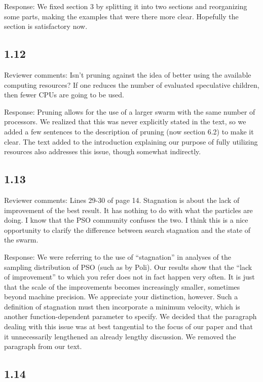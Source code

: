\documentclass[onecolumn, 12pt]{article}
\begin{document}
Response: We fixed section 3 by splitting it into two sections and reorganizing
some parts, making the examples that were there more clear.  Hopefully the
section is satisfactory now.

\subsection*{1.12}

Reviewer comments: Isn't pruning against the idea of better using the available
computing resources? If one reduces the number of evaluated speculative
children, then fewer CPUs are going to be used.

Response: Pruning allows for the use of a larger swarm with the same number of
processors.  We realized that this was never explicitly stated in the text, so
we added a few sentences to the description of pruning (now section 6.2) to
make it clear.  The text added to the introduction explaining our purpose of
fully utilizing resources also addresses this issue, though somewhat
indirectly.

\subsection*{1.13}

Reviewer comments: Lines 29-30 of page 14. Stagnation is about the lack of
improvement of the best result. It has nothing to do with what the particles
are doing. I know that the PSO community confuses the two. I think this is a
nice opportunity to clarify the difference between search stagnation and the
state of the swarm.

Response: We were referring to the use of ``stagnation'' in analyses of the
sampling distribution of PSO (such as by Poli).  Our results show that the
``lack of improvement'' to which you refer does not in fact happen very often.
It is just that the scale of the improvements becomes increasingly smaller,
sometimes beyond machine precision.  We appreciate your distinction, however.
Such a definition of stagnation must then incorporate a minimum velocity, which
is another function-dependent parameter to specify.  We decided that the
paragraph dealing with this issue was at best tangential to the focus of our
paper and that it unnecessarily lengthened an already lengthy discussion.  We
removed the paragraph from our text.

\subsection*{1.14}
\end{document}
